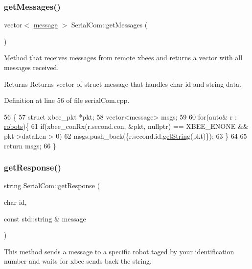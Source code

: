 \subsubsection{\texorpdfstring{get\+Messages()}{getMessages()}}
{\footnotesize\ttfamily vector$<$ \hyperlink{structmessage}{message} $>$ Serial\+Com\+::get\+Messages (\begin{DoxyParamCaption}{ }\end{DoxyParamCaption})}



Method that receives messages from remote xbees and returns a vector with all messages received. 

\begin{DoxyReturn}{Returns}
Returns vector of struct message that handles char id and string data. 
\end{DoxyReturn}


Definition at line 56 of file serial\+Com.\+cpp.


\begin{DoxyCode}
56                                        \{
57     \textcolor{keyword}{struct }xbee\_pkt *pkt;
58     vector<message> msgs;
59 
60     \textcolor{keywordflow}{for}(\textcolor{keyword}{auto}& r : \hyperlink{class_serial_com_ae20f6fe8f53cb581b285924eda5ad01c}{robots})\{
61         \textcolor{keywordflow}{if}(xbee\_conRx(r.second.con, &pkt, \textcolor{keyword}{nullptr}) == XBEE\_ENONE && pkt->dataLen > 0)
62             msgs.push\_back(\{r.second.id,\hyperlink{class_serial_com_a2171dcfcdcecc0ac18b9e206b28608be}{getString}(pkt)\});
63     \}
64 
65     \textcolor{keywordflow}{return} msgs;
66 \}
\end{DoxyCode}
\mbox{\label{class_serial_com_a7680deb087f1746d4d8c38d6fc2d25fb}} 
\subsubsection{\texorpdfstring{get\+Response()}{getResponse()}}
{\footnotesize\ttfamily string Serial\+Com\+::get\+Response (\begin{DoxyParamCaption}\item[{char}]{id,  }\item[{const std\+::string \&}]{message }\end{DoxyParamCaption})}

This method sends a message to a specific robot taged by your identification number and waits for xbee sends back the string.


